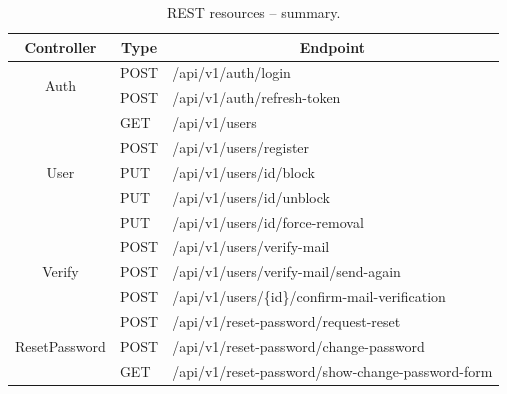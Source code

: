 \documentclass[a4paper,twoside,12pt]{book}
\begin{document}
\begin{table}[]
\centering
\caption{REST resources – summary.}
\label{id:tab:rest_api}
\begin{tabular}{|c|l|l|}
\hline
\textbf{Controller}                                                & \multicolumn{1}{c|}{\textbf{Type}}   & \multicolumn{1}{c|}{\textbf{Endpoint}} \\ \hline

\multicolumn{1}{|c|}{\multirow{2}{*}{Auth}}                        & \multicolumn{1}{l|}{POST}           & /api/v1/auth/login                    \\
\multicolumn{1}{|c|}{}                                             & \multicolumn{1}{l|}{POST}           & /api/v1/auth/refresh-token \\ \hline

\multicolumn{1}{|c|}{\multirow{5}{*}{User}}                        & \multicolumn{1}{l|}{GET}            & /api/v1/users\\
\multicolumn{1}{|c|}{}                                             & \multicolumn{1}{l|}{POST}           & /api/v1/users/register \\
\multicolumn{1}{|c|}{}                                             & \multicolumn{1}{l|}{PUT}            & /api/v1/users/{id}/block \\  
\multicolumn{1}{|c|}{}                                             & \multicolumn{1}{l|}{PUT}            & /api/v1/users/{id}/unblock \\ 
\multicolumn{1}{|c|}{}                                             & \multicolumn{1}{l|}{PUT}            & /api/v1/users/{id}/force-removal \\ \hline

\multicolumn{1}{|c|}{\multirow{3}{*}{Verify}}                      & \multicolumn{1}{l|}{POST}           & /api/v1/users/verify-mail  \\
\multicolumn{1}{|c|}{}                                             & \multicolumn{1}{l|}{POST}           & /api/v1/users/verify-mail/send-again \\
\multicolumn{1}{|c|}{}                                             & \multicolumn{1}{l|}{POST}           & /api/v1/users/\{id\}/confirm-mail-verification \\ \hline

\multicolumn{1}{|c|}{\multirow{3}{*}{ResetPassword}}               & \multicolumn{1}{l|}{POST}           & /api/v1/reset-password/request-reset  \\
\multicolumn{1}{|c|}{}                                             & \multicolumn{1}{l|}{POST}           & /api/v1/reset-password/change-password \\
\multicolumn{1}{|c|}{}                                             & \multicolumn{1}{l|}{GET}            & /api/v1/reset-password/show-change-password-form \\  \hline


\end{tabular}
\end{table}
\end{document}
